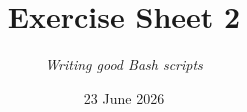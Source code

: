 




\title{{\vspace{-15mm}\huge\textbf{Exercise Sheet 2}}}
\author{\textit{Writing good Bash scripts}}
\date{{\small 23 June 2026}}


    \maketitle
    
    \medskip
    
    \medskip
    
    \newpage
    
    \newpage
    
    \medskip
    
    \medskip
    
